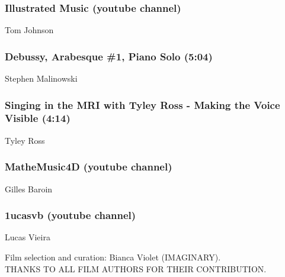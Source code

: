 \subsubsection*{Illustrated Music (youtube channel)}
Tom Johnson

\subsubsection*{Debussy, Arabesque \#1, Piano Solo (5:04)}
Stephen Malinowski

\subsubsection*{Singing in the MRI with Tyley Ross - Making the Voice Visible (4:14)}
Tyley Ross

\subsubsection*{MatheMusic4D (youtube channel)}
Gilles Baroin

\subsubsection*{1ucasvb (youtube channel)}
Lucas Vieira

\vfill

Film selection and curation: Bianca Violet (IMAGINARY).\\
THANKS TO ALL FILM AUTHORS FOR THEIR CONTRIBUTION.


